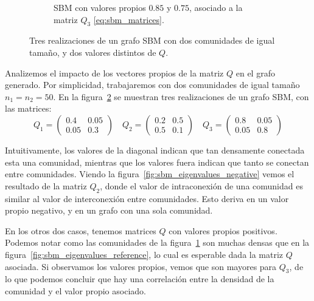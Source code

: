 \documentclass{article}
\begin{document}
\begin{figure}[htb]
\begin{subfigure}{0.49\textwidth}
        \caption{SBM con valores propios $0.85$ y $0.75$, asociado a la matriz $Q_3$ \eqref{eq:sbm_matrices}.}
        \label{fig:sbm_eigenvalues_big}
    \end{subfigure}
    \caption{Tres realizaciones de un grafo SBM con dos comunidades de igual tamaño, y dos valores distintos de $Q$.}
    \label{fig:sbm_eigenvalues}
\end{figure}

Analizemos el impacto de los vectores propios de la matriz $Q$ en el grafo generado. Por simplicidad, trabajaremos con dos comunidades de igual tamaño $n_1=n_2=50$.
En la figura~\ref{fig:sbm_eigenvalues} se muestran tres realizaciones de un grafo SBM, con las matrices:
\begin{equation}
    \label{eq:sbm_matrices}
    Q_1 = \left( \begin{matrix}
        0.4 & 0.05 \\
        0.05 & 0.3
    \end{matrix} \right) \quad
    Q_2 = \left( \begin{matrix}
        0.2 & 0.5 \\
        0.5 & 0.1
    \end{matrix} \right) \quad
    Q_3 = \left( \begin{matrix}
        0.8 & 0.05 \\
        0.05 & 0.8
    \end{matrix} \right)
\end{equation}

Intuitivamente, los valores de la diagonal indican que tan densamente conectada esta una comunidad, mientras que los valores fuera indican que tanto se conectan 
entre comunidades. Viendo la figura~\ref{fig:sbm_eigenvalues_negative} vemos el resultado de la matriz $Q_2$, donde el valor de intraconexión de una comunidad es 
similar al valor de interconexión entre comunidades. Esto deriva en un valor propio negativo, y en un grafo con una sola comunidad.

En los otros dos casos, tenemos matrices $Q$ con valores propios positivos. Podemos notar como las comunidades de la figura~\ref{fig:sbm_eigenvalues_big} son muchas 
densas que en la figura~\ref{fig:sbm_eigenvalues_reference}, lo cual es esperable dada la matriz $Q$ asociada. Si observamos los valores propios, vemos que son 
mayores para $Q_3$, de lo que podemos concluir que hay una correlación entre la densidad de la comunidad y el valor propio asociado.
\end{document}
